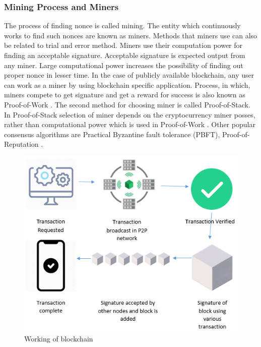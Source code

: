 \documentclass[a4paper,twoside,12pt]{report}
\begin{document}
\begin{spacing}{1.5}
\subsubsection{Mining Process and Miners}
\label{miningprocess}
The process of finding nonce is called mining. The entity which continuously works to find such nonces are known as miners. Methods that miners use can also be related to trial and error method. Miners use their computation power for finding an acceptable signature. Acceptable signature is expected output from any miner. Large computational power increases the possibility of finding out proper nonce in lesser time. In the case of publicly available blockchain, any user can work as a miner by using blockchain specific application. Process, in which, miners compete to get signature and get a reward for success is also known as Proof-of-Work \cite{satoshinakamoto}. The second method for choosing miner is called Proof-of-Stack. In Proof-of-Stack selection of miner depends on the cryptocurrency miner posses, rather than computational power which is used in Proof-of-Work \cite{saad_exploring_2019}. Other popular consensus algorithms are Practical Byzantine fault tolerance (PBFT), Proof-of-Reputation \cite{saad_exploring_2019}.
\begin{figure}[h!]
\begin{center}
  \includegraphics[width=0.8\linewidth]{images/workingofblockchain.png}
  \caption{\fontsize{10}{10}\selectfont Working of blockchain}
  \label{img: workingofblockchain}
\end{center}
\end{figure}  

\end{spacing}
\end{document}
